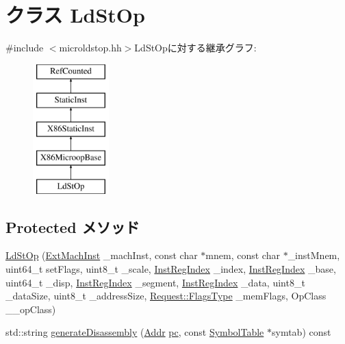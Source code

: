 \hypertarget{classX86ISA_1_1LdStOp}{
\section{クラス LdStOp}
\label{classX86ISA_1_1LdStOp}
}


{\ttfamily \#include $<$microldstop.hh$>$}LdStOpに対する継承グラフ:\begin{figure}[H]
\begin{center}
\leavevmode
\includegraphics[height=5cm]{classX86ISA_1_1LdStOp}
\end{center}
\end{figure}
\subsection*{Protected メソッド}
\begin{DoxyCompactItemize}
\item 
\hyperlink{classX86ISA_1_1LdStOp_aba3a879f9ac4e6e45e95e8608e55615e}{LdStOp} (\hyperlink{structX86ISA_1_1ExtMachInst}{ExtMachInst} \_\-machInst, const char $\ast$mnem, const char $\ast$\_\-instMnem, uint64\_\-t setFlags, uint8\_\-t \_\-scale, \hyperlink{structX86ISA_1_1InstRegIndex}{InstRegIndex} \_\-index, \hyperlink{structX86ISA_1_1InstRegIndex}{InstRegIndex} \_\-base, uint64\_\-t \_\-disp, \hyperlink{structX86ISA_1_1InstRegIndex}{InstRegIndex} \_\-segment, \hyperlink{structX86ISA_1_1InstRegIndex}{InstRegIndex} \_\-data, uint8\_\-t \_\-dataSize, uint8\_\-t \_\-addressSize, \hyperlink{classRequest_a2da503161d95c65aea559dbabcf570aa}{Request::FlagsType} \_\-memFlags, OpClass \_\-\_\-opClass)
\item 
std::string \hyperlink{classX86ISA_1_1LdStOp_a95d323a22a5f07e14d6b4c9385a91896}{generateDisassembly} (\hyperlink{base_2types_8hh_af1bb03d6a4ee096394a6749f0a169232}{Addr} \hyperlink{namespaceX86ISA_aecb63c74e066ecd98e04d057e39028c9}{pc}, const \hyperlink{classSymbolTable}{SymbolTable} $\ast$symtab) const 
\end{DoxyCompactItemize}
